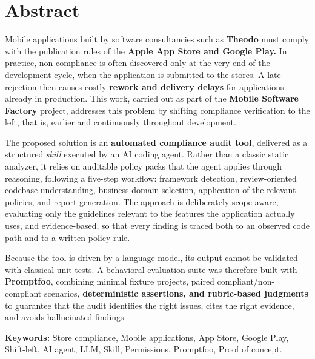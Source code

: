 \chapter*{Abstract}

\vspace{0.5cm}

Mobile applications built by software consultancies such as \textbf{Theodo} must comply with the publication rules of the \textbf{Apple App Store and Google Play.} In practice, non-compliance is often discovered only at the very end of the development cycle, when the application is submitted to the stores. A late rejection then causes costly \textbf{rework and delivery delays} for applications already in production. This work, carried out as part of the \textbf{Mobile Software Factory} project, addresses this problem by shifting compliance verification to the left, that is, earlier and continuously throughout development.

\vspace{0.3cm}

The proposed solution is an \textbf{automated compliance audit tool}, delivered as a structured \textit{skill} executed by an AI coding agent. Rather than a classic static analyzer, it relies on auditable policy packs that the agent applies through reasoning, following a five-step workflow: framework detection, review-oriented codebase understanding, business-domain selection, application of the relevant policies, and report generation. The approach is deliberately scope-aware, evaluating only the guidelines relevant to the features the application actually uses, and evidence-based, so that every finding is traced both to an observed code path and to a written policy rule.

\vspace{0.3cm}

Because the tool is driven by a language model, its output cannot be validated with classical unit tests. A behavioral evaluation suite was therefore built with \textbf{Promptfoo}, combining minimal fixture projects, paired compliant/non-compliant scenarios, \textbf{deterministic assertions, and rubric-based judgments} to guarantee that the audit identifies the right issues, cites the right evidence, and avoids hallucinated findings.

\vspace{0.8cm}

\noindent\textbf{Keywords:} Store compliance, Mobile applications, App Store, Google Play, Shift-left, AI agent, LLM, Skill, Permissions, Promptfoo, Proof of concept.

\clearpage
